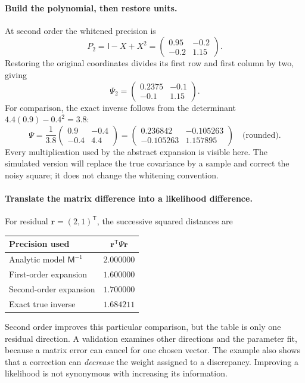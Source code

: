 \documentclass[11pt]{article}
\newcommand{\M}{\mathsf{M}}
\newcommand{\I}{\mathsf{I}}
\newcommand{\T}{^{\mathsf{T}}}
\begin{document}
\paragraph{Build the polynomial, then restore units.}
At second order the whitened precision is
\begin{equation}
 P_2=\I-X+X^2=\begin{pmatrix}0.95&-0.2\\-0.2&1.15\end{pmatrix}.
\end{equation}
Restoring the original coordinates divides its first row and first column
by two, giving
\begin{equation}
 \Psi_2=\begin{pmatrix}0.2375&-0.1\\-0.1&1.15\end{pmatrix}.
 \label{eq:matrix-precision2}
\end{equation}
For comparison, the exact inverse follows from the determinant
$4.4(0.9)-0.4^2=3.8$:
\begin{equation}
 \Psi=\frac1{3.8}\begin{pmatrix}0.9&-0.4\\-0.4&4.4\end{pmatrix}
 =\begin{pmatrix}0.236842&-0.105263\\-0.105263&1.157895\end{pmatrix}
 \quad\text{(rounded)}.
\end{equation}
Every multiplication used by the abstract expansion is visible here.
The simulated version will replace the true covariance by a sample and
correct the noisy square; it does not change the whitening convention.

\paragraph{Translate the matrix difference into a likelihood difference.}
For residual $\boldsymbol r=(2,1)\T$, the successive squared distances are
\begin{center}
\begin{tabular}{lc}
\toprule
Precision used & $\boldsymbol r\T\Psi\boldsymbol r$\\
\midrule
Analytic model $\M^{-1}$ & $2.000000$\\
First-order expansion & $1.600000$\\
Second-order expansion & $1.700000$\\
Exact true inverse & $1.684211$\\
\bottomrule
\end{tabular}
\end{center}
Second order improves this particular comparison, but the table is only
one residual direction. A validation examines other directions and the
parameter fit, because a matrix error can cancel for one chosen vector.
The example also shows that a correction can \emph{decrease} the weight
assigned to a discrepancy. Improving a likelihood is not synonymous with
increasing its information.
\end{document}
